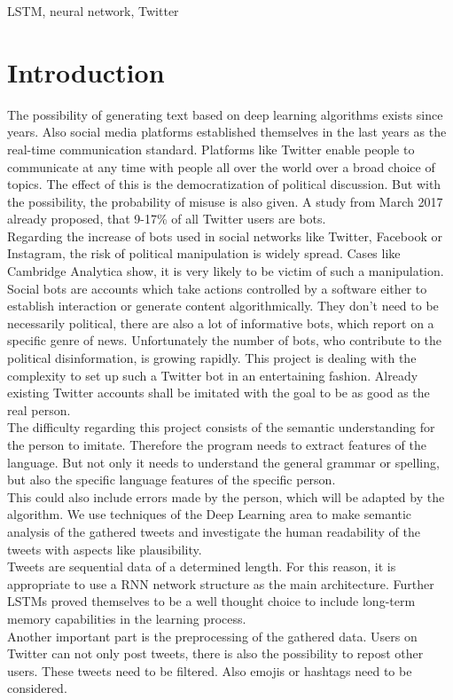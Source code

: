 \documentclass[conference]{IEEEtran}
\begin{document}
\begin{IEEEkeywords}
LSTM, neural network, Twitter
\end{IEEEkeywords}

\section{Introduction}

The possibility of generating text based on deep learning algorithms exists since years. Also social media platforms established themselves in the last years as the real-time communication standard. Platforms like Twitter enable people to communicate at any time with people all over the world over a broad choice of topics. The effect of this is the democratization of political discussion. But with the possibility, the probability of misuse is also given. A study from March 2017 already proposed, that 9-17\% of all Twitter users are bots.\\
Regarding the increase of bots used in social networks like Twitter, Facebook or Instagram, the risk of political manipulation is widely spread. Cases like Cambridge Analytica show, it is very likely to be victim of such a manipulation.\\
Social bots are accounts which take actions controlled by a software either to establish interaction or generate content algorithmically. They don’t need to be necessarily political, there are also a lot of informative bots, which report on a specific genre of news. Unfortunately the number of bots, who contribute to the political disinformation, is growing rapidly. This project is dealing with the complexity to set up such a Twitter bot in an entertaining fashion. Already existing Twitter accounts shall be imitated with the goal to be as good as the real person.\\
The difficulty regarding this project consists of the semantic understanding for the person to imitate. Therefore the program needs to extract features of the language. But not only it needs to understand the general grammar or spelling, but also the specific language features of the specific person.\\
This could also include errors made by the person, which will be adapted by the algorithm. We use techniques of the Deep Learning area to make semantic analysis of the gathered tweets and investigate the human readability of the tweets with aspects like plausibility.\\
Tweets are sequential data of a determined length. For this reason, it is appropriate to use a RNN network structure as the main architecture. Further LSTMs proved themselves to be a well thought choice to include long-term memory capabilities in the learning process.\\
Another important part is the preprocessing of the gathered data. Users on Twitter can not only post tweets, there is also the possibility to repost other users. These tweets need to be filtered. Also emojis or hashtags need to be considered.\\
\end{document}
